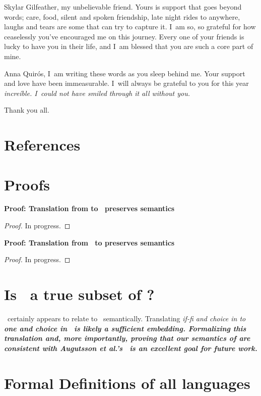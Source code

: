 \documentclass[manuscript,screen,review, 12pt, nonacm]{acmart}
\begin{document}
Skylar Gilfeather, my unbelievable friend. Yours is support that goes
beyond words; care, food, silent and spoken friendship, late night rides to
anywhere, laughs and tears are some that can try to capture it. I~am so, so
grateful for how ceaselessly you've encouraged me on this journey. Every one
of your friends is lucky to have you in their life, and I~am blessed that 
you are such a core part of mine. 

Anna Quirós, I~am writing these words as you sleep behind me. Your support
and love have been immeasurable. I~will always be grateful to you for this
year \it{increíble}. I~could not have smiled through it all without you. 

Thank you all. 

\section{References}


\renewcommand\thesection{\Alph{section}}
\setcounter{section}{0}
\section{Proofs}
\begin{outline}
\1 \bf{Proof: Translation from \VMinus to \D\ preserves semantics }
\begin{proof}
  In progress. 
\end{proof}
\1 \bf{Proof: Translation from \PPlus\ to \VMinus preserves semantics }
\begin{proof}
  In progress. 
\end{proof}
\end{outline}


\section{Is \VMinus\ a true subset of \VC?}
\VMinus\ certainly appears to relate to \VC\ semantically. Translating
\it{if-fi} and choice in \VMinus to \bf{one} and choice in \VC\ is likely a
sufficient embedding. Formalizing this translation and, more importantly,
proving that our semantics of \VMinus are consistent with Augutsson et al.'s
\VC\ is an excellent goal for future work. 

\newcommand\dbar{▯}
\section{Formal Definitions of all languages}
\label{languagedefs}
\end{document}
